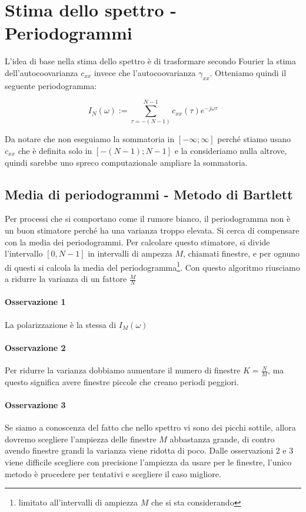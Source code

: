 \section{Stima dello spettro - Periodogrammi}
L'idea di base nella stima dello spettro è di trasformare secondo Fourier la stima dell'autocoovarianza $c_{xx}$ invece che l'autocoovarianza $\gamma_{xx}$. Otteniamo quindi il seguente periodogramma:

  \[ I_N(\omega):=\sum_{\tau=-(N-1)}^{N-1}{c_{xx}(\tau)e^{-j\omega\tau}} \]
  
Da notare che non eseguiamo la sommatoria in $[-\infty;\infty]$ perché stiamo usano $c_{xx}$ che è definita solo in $[-(N-1);N-1]$ e la consideriamo nulla altrove, quindi sarebbe uno spreco computazionale ampliare la sommatoria.

\subsection{Media di periodogrammi - Metodo di Bartlett}
Per processi che si comportano come il rumore bianco, il periodogramma non è un buon stimatore perché ha una varianza troppo elevata. Si cerca di compensare con la media dei periodogrammi. Per calcolare questo stimatore, si divide l'intervallo $[0,N-1]$ in intervalli di ampezza $M$, chiamati finestre, e per ognuno di questi si calcola la media del periodogramma\footnote{limitato all'intervalli di ampiezza $M$ che si sta considerando}. Con questo algoritmo riusciamo a ridurre la varianza di un fattore $\frac{M}{N}$
\paragraph{Osservazione 1} La polarizzazione è la stessa di $I_M(\omega)$
\paragraph{Osservazione 2} Per ridurre la varianza dobbiamo aumentare il numero di finestre $K=\frac{N}{M}$, ma questo significa avere finestre piccole che creano periodi peggiori.
\paragraph{Osservazione 3} Se siamo a conoscenza del fatto che nello spettro vi sono dei picchi sottile, allora dovremo scegliere l'ampiezza delle finestre $M$ abbastanza grande, di contro avendo finestre grandi la varianza viene ridotta di poco.\newline\newline
Dalle osservazioni 2 e 3 viene difficile scegliere con precisione l'ampiezza da usare per le finestre, l'unico metodo è procedere per tentativi e scegliere il caso migliore.
